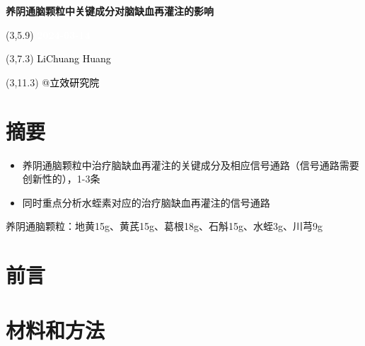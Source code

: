 \documentclass[
]{article}
\author{}
\date{\vspace{-2.5em}}
\providecommand{\tightlist}{%
  \setlength{\itemsep}{0pt}\setlength{\parskip}{0pt}}
\begin{document}
\begin{titlepage} 
\begin{center} \textbf{\Huge
养阴通脑颗粒中关键成分对脑缺血再灌注的影响}
\vspace{4em} \begin{textblock}{10}(3,5.9) \huge
\textbf{\textcolor{white}{2024-03-14}}
\end{textblock} \begin{textblock}{10}(3,7.3)
\Large \textcolor{black}{LiChuang Huang}
\end{textblock} \begin{textblock}{10}(3,11.3)
\Large \textcolor{black}{@立效研究院}
\end{textblock} \end{center} \end{titlepage}
\restoregeometry


\tableofcontents

\listoffigures

\listoftables

\newpage


\hypertarget{abstract}{%
\section{摘要}\label{abstract}}

\begin{itemize}
\tightlist
\item
  养阴通脑颗粒中治疗脑缺血再灌注的关键成分及相应信号通路（信号通路需要创新性的），1-3条
\item
  同时重点分析水蛭素对应的治疗脑缺血再灌注的信号通路
\end{itemize}

养阴通脑颗粒：地黄15g、黄芪15g、葛根18g、石斛15g、水蛭3g、川芎9g

\hypertarget{introduction}{%
\section{前言}\label{introduction}}

\hypertarget{methods}{%
\section{材料和方法}\label{methods}}
\end{document}
